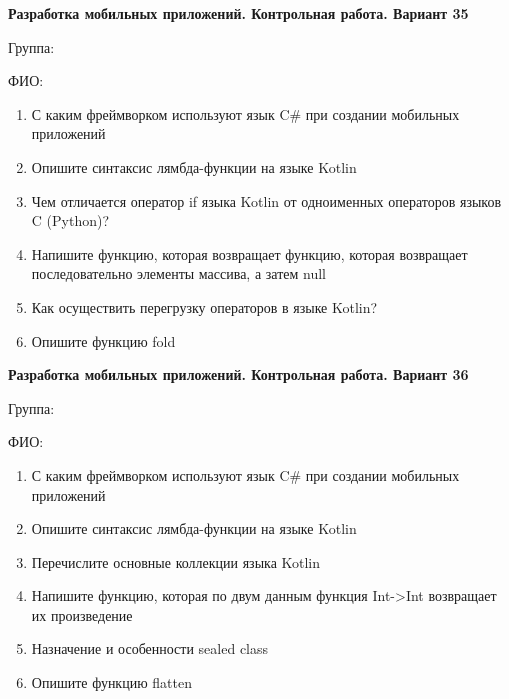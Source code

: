 \documentclass[12pt]{article}
\begin{document}
\newpage\begin{minipage}{\textwidth}
\textbf{Разработка мобильных приложений. Контрольная работа. Вариант 35}

Группа: \underline{\hspace{3cm}}

ФИО: \underline{\hspace{10cm}}

\begin{enumerate}
\item С каким фреймворком используют язык C\# при создании мобильных приложений
\item Опишите синтаксис лямбда-функции на языке Kotlin
\item Чем отличается оператор if языка Kotlin от одноименных операторов языков C (Python)?
\item Напишите функцию, которая возвращает функцию, которая возвращает последовательно элементы массива, а затем null
\item Как осуществить перегрузку операторов в языке Kotlin?
\item Опишите функцию fold

\end{enumerate}
\end{minipage}

\newpage\begin{minipage}{\textwidth}
\textbf{Разработка мобильных приложений. Контрольная работа. Вариант 36}

Группа: \underline{\hspace{3cm}}

ФИО: \underline{\hspace{10cm}}

\begin{enumerate}
\item С каким фреймворком используют язык C\# при создании мобильных приложений
\item Опишите синтаксис лямбда-функции на языке Kotlin
\item Перечислите основные коллекции языка Kotlin
\item Напишите функцию, которая по двум данным функция Int->Int возвращает их произведение
\item Назначение и особенности sealed class
\item Опишите функцию flatten

\end{enumerate}
\end{minipage}
\end{document}
